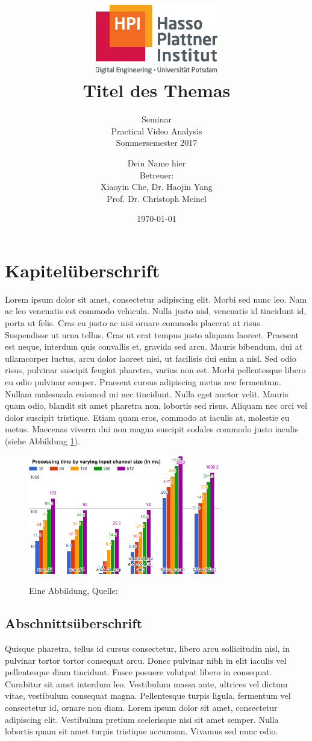 \documentclass[a4paper,12pt,pagesize,headsepline,bibtotoc,titlepage]{scrartcl}
\title{
	\includegraphics*[width=0.4\textwidth]{hpi_logo_2017.eps}\\
	\vspace{24pt}
	Titel des Themas
}
\subtitle{
	Seminar\\
	Practical Video Analysis\\
	Sommersemester 2017
}
\author{
	Dein Name hier\\[12pt]
	Betreuer:\\
	Xiaoyin Che,
	Dr. Haojin Yang\\
	Prof. Dr. Christoph Meinel
}
\date{\today}
\begin{document}
\maketitle
\tableofcontents
\newpage


\section{Kapitelüberschrift}
Lorem ipsum dolor sit amet, consectetur adipiscing elit. Morbi sed nunc leo. Nam ac leo venenatis est commodo vehicula. Nulla justo nisl, venenatis id tincidunt id, porta ut felis. Cras eu justo ac nisi ornare commodo placerat at risus. Suspendisse ut urna tellus. Cras ut erat tempus justo aliquam laoreet. Praesent est neque, interdum quis convallis et, gravida sed arcu. Mauris bibendum, dui at ullamcorper luctus, arcu dolor laoreet nisi, ut facilisis dui enim a nisl. Sed odio risus, pulvinar suscipit feugiat pharetra, varius non est. Morbi pellentesque libero eu odio pulvinar semper. Praesent cursus adipiscing metus nec fermentum. Nullam malesuada euismod mi nec tincidunt. Nulla eget auctor velit. Mauris quam odio, blandit sit amet pharetra non, lobortis sed risus. Aliquam nec orci vel dolor suscipit tristique. Etiam quam eros, commodo at iaculis at, molestie eu metus. Maecenas viverra dui non magna suscipit sodales commodo justo iaculis (siehe Abbildung \ref{abb:test}).

\begin{figure}[hbp]
\begin{center}
\includegraphics*[width=0.75\textwidth]{beispiel.png}\\
\caption{Eine Abbildung, Quelle: \cite{BMXNet17}}
\label{abb:test}
\end{center}
\end{figure}

\subsection{Abschnittsüberschrift}
Quisque pharetra, tellus id cursus consectetur, libero arcu sollicitudin nisl, in pulvinar tortor tortor consequat arcu. Donec pulvinar nibh in elit iaculis vel pellentesque diam tincidunt. Fusce posuere volutpat libero in consequat. Curabitur sit amet interdum leo. Vestibulum massa ante, ultrices vel dictum vitae, vestibulum consequat magna. Pellentesque turpis ligula, fermentum vel consectetur id, ornare non diam. Lorem ipsum dolor sit amet, consectetur adipiscing elit. Vestibulum pretium scelerisque nisi sit amet semper. Nulla lobortis quam sit amet turpis tristique accumsan. Vivamus sed nunc odio.
\end{document}
